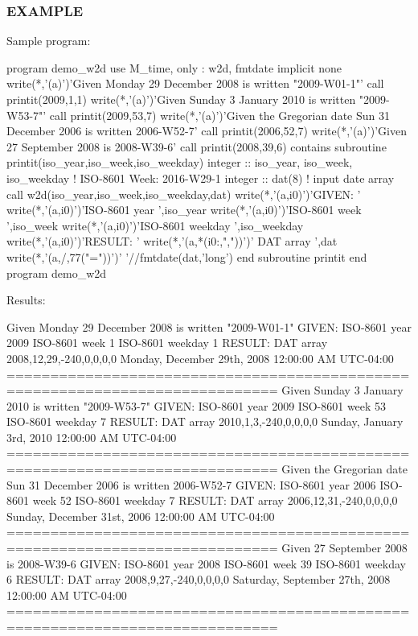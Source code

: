 \subsubsection*{E\+X\+A\+M\+P\+LE}

\begin{DoxyVerb}Sample program:

 program demo_w2d
 use M_time, only : w2d, fmtdate
 implicit none
    write(*,'(a)')'Given Monday 29 December 2008 is written "2009-W01-1"'
    call printit(2009,1,1)
    write(*,'(a)')'Given Sunday 3 January 2010 is written "2009-W53-7"'
    call printit(2009,53,7)
    write(*,'(a)')'Given the Gregorian date Sun 31 December 2006 is written 2006-W52-7'
    call printit(2006,52,7)
    write(*,'(a)')'Given 27 September 2008 is 2008-W39-6'
    call printit(2008,39,6)
 contains
 subroutine printit(iso_year,iso_week,iso_weekday)
 integer  :: iso_year, iso_week, iso_weekday ! ISO-8601 Week:   2016-W29-1
 integer  :: dat(8)                          ! input date array
    call w2d(iso_year,iso_week,iso_weekday,dat)
    write(*,'(a,i0)')'GIVEN:           '
    write(*,'(a,i0)')'ISO-8601 year    ',iso_year
    write(*,'(a,i0)')'ISO-8601 week    ',iso_week
    write(*,'(a,i0)')'ISO-8601 weekday ',iso_weekday
    write(*,'(a,i0)')'RESULT:          '
    write(*,'(a,*(i0:,","))')'   DAT array        ',dat
    write(*,'(a,/,77("="))')'    '//fmtdate(dat,'long')
 end subroutine printit
 end program demo_w2d

Results:

 Given Monday 29 December 2008 is written "2009-W01-1"
 GIVEN:
 ISO-8601 year    2009
 ISO-8601 week    1
 ISO-8601 weekday 1
 RESULT:
    DAT array        2008,12,29,-240,0,0,0,0
     Monday, December 29th, 2008 12:00:00 AM UTC-04:00
 =============================================================================
 Given Sunday 3 January 2010 is written "2009-W53-7"
 GIVEN:
 ISO-8601 year    2009
 ISO-8601 week    53
 ISO-8601 weekday 7
 RESULT:
    DAT array        2010,1,3,-240,0,0,0,0
     Sunday, January 3rd, 2010 12:00:00 AM UTC-04:00
 =============================================================================
 Given the Gregorian date Sun 31 December 2006 is written 2006-W52-7
 GIVEN:
 ISO-8601 year    2006
 ISO-8601 week    52
 ISO-8601 weekday 7
 RESULT:
    DAT array        2006,12,31,-240,0,0,0,0
     Sunday, December 31st, 2006 12:00:00 AM UTC-04:00
 =============================================================================
 Given 27 September 2008 is 2008-W39-6
 GIVEN:
 ISO-8601 year    2008
 ISO-8601 week    39
 ISO-8601 weekday 6
 RESULT:
    DAT array        2008,9,27,-240,0,0,0,0
     Saturday, September 27th, 2008 12:00:00 AM UTC-04:00
 =============================================================================
\end{DoxyVerb}


